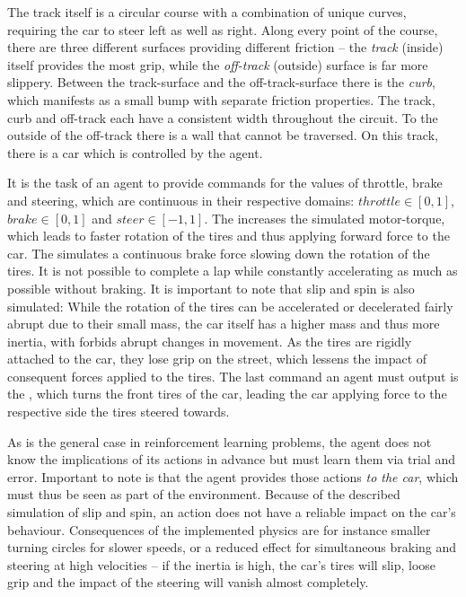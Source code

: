 The track itself is a circular course with a combination of unique curves, requiring the car to steer left as well as right. Along every point of the course, there are three different surfaces providing different friction -- the \textit{track} (inside) itself provides the most grip, while the \textit{off-track} (outside) surface is far more slippery. Between the track-surface and the off-track-surface there is the \textit{curb}, which manifests as a small bump with separate friction properties. The track, curb and off-track each have a consistent width throughout the circuit. To the outside of the off-track there is a wall that cannot be traversed. On this track, there is a car which is controlled by the agent.

It is the task of an agent to provide commands for the values of throttle, brake and steering, which are continuous in their respective domains: $throttle \in [0,1]$, $brake \in [0,1]$ and $steer \in[-1,1]$. The  increases the simulated motor-torque, which leads to faster rotation of the tires and thus applying forward force to the car. The  simulates a continuous brake force slowing down the rotation of the tires. It is not possible to complete a lap while constantly accelerating as much as possible without braking. It is important to note that slip and spin is also simulated: While the rotation of the tires can be accelerated or decelerated fairly abrupt due to their small mass, the car itself has a higher mass and thus more inertia, with forbids abrupt changes in movement. As the tires are rigidly attached to the car, they lose grip on the street, which lessens the impact of consequent forces applied to the tires. The last command an agent must output is the , which turns the front tires of the car, leading the car applying force to the respective side the tires steered towards.

As is the general case in reinforcement learning problems, the agent does not know the implications of its actions in advance but must learn them via trial and error. Important to note is that the agent provides those actions \textit{to the car}, which must thus be seen as part of the environment. Because of the described simulation of slip and spin, an action does not have a reliable impact on the car's behaviour. Consequences of the implemented physics are for instance smaller turning circles for slower speeds, or a reduced effect for simultaneous braking and steering at high velocities -- if the inertia is high, the car's tires will slip, loose grip and the impact of the steering will vanish almost completely.

